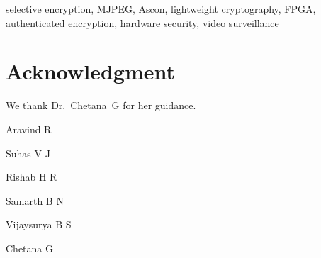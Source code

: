 \documentclass{ieeeaccess}
\theoremstyle{definition}\newtheorem{definition}{Definition}
\begin{document}
\begin{keywords}
selective encryption, MJPEG, Ascon, lightweight cryptography, FPGA, authenticated encryption, hardware security, video surveillance
\end{keywords}

\titlepgskip=-21pt
\maketitle









\section*{Acknowledgment}
We thank Dr.~Chetana~G for her guidance. 




\begin{IEEEbiographynophoto}{Aravind R}
\end{IEEEbiographynophoto}
\begin{IEEEbiographynophoto}{Suhas V J}
\end{IEEEbiographynophoto}
\begin{IEEEbiographynophoto}{Rishab H R}
\end{IEEEbiographynophoto}
\begin{IEEEbiographynophoto}{Samarth B N}
\end{IEEEbiographynophoto}
\begin{IEEEbiographynophoto}{Vijaysurya B S}
\end{IEEEbiographynophoto}
\begin{IEEEbiographynophoto}{Chetana G}
\end{IEEEbiographynophoto}
\EOD
\end{document}

